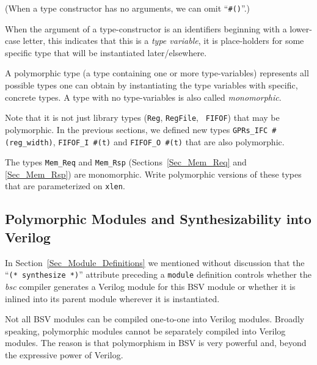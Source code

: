 (When a type constructor has no arguments, we can omit ``{\tt \#()}''.)

When the argument of a type-constructor is an identifiers beginning
with a lower-case letter, this indicates that this is a \emph{type
variable}, {\ie} it is place-holders for some specific type that will
be instantiated later/elsewhere.

A polymorphic type (a type containing one or more type-variables)
represents all possible types one can obtain by instantiating the type
variables with specific, concrete types.  A type with no
type-variables is also called \emph{monomorphic}.

Note that it is not just library types ({\tt Reg}, {\tt RegFile}, {\tt
FIFOF}) that may be polymorphic.  In the previous sections, we defined
new types \verb|GPRs_IFC #(reg_width)|, \verb|FIFOF_I #(t)| and
\verb|FIFOF_O #(t)| that are also polymorphic.

\hdivider

\Exercise

The types {\tt Mem\_Req} and {\tt Mem\_Rsp}
(Sections~\ref{Sec_Mem_Req} and \ref{Sec_Mem_Rsp}) are monomorphic.
Write polymorphic versions of these types that are parameterized on
{\tt xlen}.

\Endexercise


\subsection{Polymorphic Modules and Synthesizability into Verilog}

\label{Sec_Polymorphic_Types_and_Synthesizability}


In Section~\ref{Sec_Module_Definitions} we mentioned without
discussion that the ``{\tt (* synthesize *)}'' attribute preceding a
{\tt module} definition controls whether the \emph{bsc} compiler
generates a Verilog module for this BSV module or whether it is
inlined into its parent module wherever it is instantiated.

Not all BSV modules can be compiled one-to-one into Verilog modules.
Broadly speaking, polymorphic modules cannot be separately compiled
into Verilog modules.  The reason is that polymorphism in BSV is very
powerful and, beyond the expressive power of Verilog.

